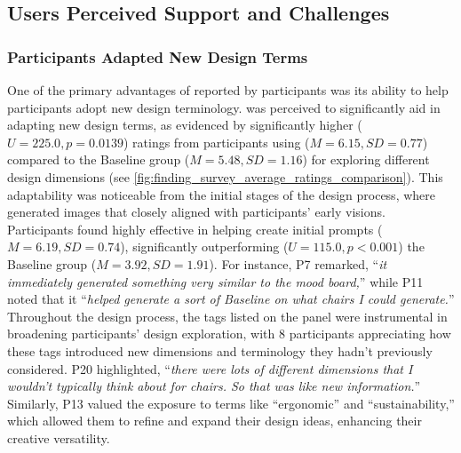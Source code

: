 \subsection{Users Perceived Support and Challenges}
\label{finding6.3:perception}

\subsubsection{ \toolname{} Participants Adapted New Design Terms}
One of the primary advantages of \toolname{} reported by participants was its ability to help participants adopt new design terminology. 
\toolname{} was perceived to significantly aid in adapting new design terms, as evidenced by significantly higher ($U = 225.0, p = 0.0139$) ratings from participants using \toolname{} ($M = 6.15, SD = 0.77$) compared to the Baseline group ($M = 5.48, SD = 1.16$) for exploring different design dimensions (see \autoref{fig:finding_survey_average_ratings_comparison}). This adaptability was noticeable from the initial stages of the design process, where \toolname{} generated images that closely aligned with participants’ early visions. Participants found \toolname{} highly effective in helping create initial prompts ($M = 6.19, SD = 0.74$), significantly outperforming ($U = 115.0, p < 0.001$) the Baseline group ($M = 3.92, SD = 1.91$). For instance, P7 remarked, “\textit{it immediately generated something very similar to the mood board,}” while P11 noted that it “\textit{helped generate a sort of Baseline on what chairs I could generate.}” Throughout the design process, the tags listed on the panel were instrumental in broadening participants' design exploration, with 8 participants appreciating how these tags introduced new dimensions and terminology they hadn't previously considered. P20 highlighted, “\textit{there were lots of different dimensions that I wouldn’t typically think about for chairs. So that was like new information.}” Similarly, P13 valued the exposure to terms like “ergonomic” and “sustainability,” which allowed them to refine and expand their design ideas, enhancing their creative versatility.

